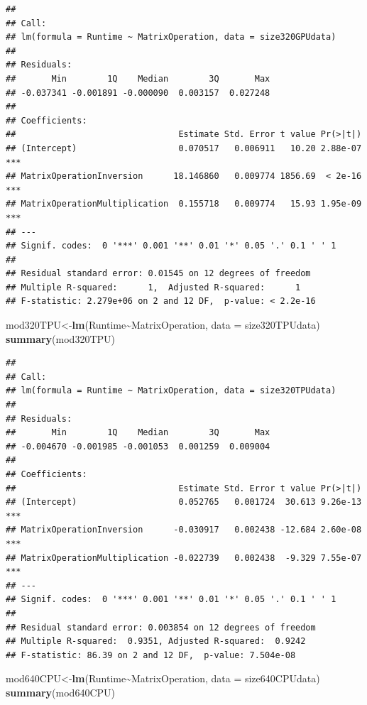 \documentclass[
]{article}
\newenvironment{Shaded}{\begin{snugshade}}{\end{snugshade}}
\newcommand{\DataTypeTok}[1]{\textcolor[rgb]{0.13,0.29,0.53}{#1}}
\newcommand{\KeywordTok}[1]{\textcolor[rgb]{0.13,0.29,0.53}{\textbf{#1}}}
\newcommand{\NormalTok}[1]{#1}
\newcommand{\OperatorTok}[1]{\textcolor[rgb]{0.81,0.36,0.00}{\textbf{#1}}}
\begin{document}
\begin{verbatim}
## 
## Call:
## lm(formula = Runtime ~ MatrixOperation, data = size320GPUdata)
## 
## Residuals:
##       Min        1Q    Median        3Q       Max 
## -0.037341 -0.001891 -0.000090  0.003157  0.027248 
## 
## Coefficients:
##                                Estimate Std. Error t value Pr(>|t|)    
## (Intercept)                    0.070517   0.006911   10.20 2.88e-07 ***
## MatrixOperationInversion      18.146860   0.009774 1856.69  < 2e-16 ***
## MatrixOperationMultiplication  0.155718   0.009774   15.93 1.95e-09 ***
## ---
## Signif. codes:  0 '***' 0.001 '**' 0.01 '*' 0.05 '.' 0.1 ' ' 1
## 
## Residual standard error: 0.01545 on 12 degrees of freedom
## Multiple R-squared:      1,  Adjusted R-squared:      1 
## F-statistic: 2.279e+06 on 2 and 12 DF,  p-value: < 2.2e-16
\end{verbatim}

\begin{Shaded}
\begin{Highlighting}[]
\NormalTok{mod320TPU\textless{}{-}}\KeywordTok{lm}\NormalTok{(Runtime}\OperatorTok{\textasciitilde{}}\NormalTok{MatrixOperation, }\DataTypeTok{data =}\NormalTok{ size320TPUdata)}
\KeywordTok{summary}\NormalTok{(mod320TPU)}
\end{Highlighting}
\end{Shaded}

\begin{verbatim}
## 
## Call:
## lm(formula = Runtime ~ MatrixOperation, data = size320TPUdata)
## 
## Residuals:
##       Min        1Q    Median        3Q       Max 
## -0.004670 -0.001985 -0.001053  0.001259  0.009004 
## 
## Coefficients:
##                                Estimate Std. Error t value Pr(>|t|)    
## (Intercept)                    0.052765   0.001724  30.613 9.26e-13 ***
## MatrixOperationInversion      -0.030917   0.002438 -12.684 2.60e-08 ***
## MatrixOperationMultiplication -0.022739   0.002438  -9.329 7.55e-07 ***
## ---
## Signif. codes:  0 '***' 0.001 '**' 0.01 '*' 0.05 '.' 0.1 ' ' 1
## 
## Residual standard error: 0.003854 on 12 degrees of freedom
## Multiple R-squared:  0.9351, Adjusted R-squared:  0.9242 
## F-statistic: 86.39 on 2 and 12 DF,  p-value: 7.504e-08
\end{verbatim}

\begin{Shaded}
\begin{Highlighting}[]
\NormalTok{mod640CPU\textless{}{-}}\KeywordTok{lm}\NormalTok{(Runtime}\OperatorTok{\textasciitilde{}}\NormalTok{MatrixOperation, }\DataTypeTok{data =}\NormalTok{ size640CPUdata)}
\KeywordTok{summary}\NormalTok{(mod640CPU)}
\end{Highlighting}
\end{Shaded}
\end{document}

